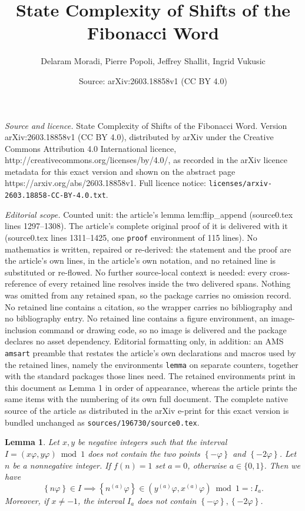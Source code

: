 \documentclass[10pt,a4paper]{amsart}
\title{State Complexity of Shifts of the Fibonacci Word}
\author{Delaram Moradi, Pierre Popoli, Jeffrey Shallit, Ingrid Vukusic}
\date{Source: arXiv:2603.18858v1 (CC BY 4.0)}
\newtheorem{lemma}{Lemma}
\newcommand{\append}[2]{#1^{(#2)}}
\newcommand{\fract}[1]{\left\{ #1 \right\}}
\newcommand{\ndelta}{n^{(a)}}
\renewcommand{\phi}{\varphi}
\begin{document}
\maketitle

\noindent\emph{Source and licence.} State Complexity of Shifts of the Fibonacci Word. Version arXiv:2603.18858v1 (CC BY 4.0), distributed by arXiv under the Creative Commons Attribution 4.0 International licence, http://creativecommons.org/licenses/by/4.0/, as recorded in the arXiv licence metadata for this exact version and shown on the abstract page https://arxiv.org/abs/2603.18858v1. Full licence notice: \texttt{licenses/arxiv-2603.18858-CC-BY-4.0.txt}.\par\smallskip

\noindent\textit{Editorial scope.} Counted unit: the article's lemma lem:flip\_append (source0.tex lines 1297--1308). The article's complete original proof of it is delivered with it (source0.tex lines 1311--1425, one \texttt{proof} environment of 115 lines). No mathematics is written, repaired or re-derived: the statement and the proof are the article's own lines, in the article's own notation, and no retained line is substituted or re-flowed.  No further source-local context is needed: every cross-reference of every retained line resolves inside the two delivered spans.  Nothing was omitted from any retained span, so the package carries no omission record.  No retained line contains a citation, so the wrapper carries no bibliography and no bibliography entry.  No retained line contains a figure environment, an image-inclusion command or drawing code, so no image is delivered and the package declares no asset dependency.  Editorial formatting only, in addition: an AMS \texttt{amsart} preamble that restates the article's own declarations and macros used by the retained lines, namely the environments \texttt{lemma} on separate counters, together with the standard packages those lines need.  The retained environments print in this document as Lemma 1 in order of appearance, whereas the article prints the same items with the numbering of its own full document.  The complete native source of the article as distributed in the arXiv e-print for this exact version is bundled unchanged as \texttt{sources/196730/source0.tex}.
\begin{lemma}\label{lem:flip_append}
Let $x,y$ be negative integers such that the interval $I = (x \phi,y \phi) \bmod 1$ does not contain the two points $\fract{-\phi}$ and $\fract{-2\phi}$.
Let $n$ be a nonnegative integer. If $f(n) = 1$ set $a=0$, otherwise $a \in \{0,1\}$.
Then we have
\begin{equation}\label{eq:flip_append}
    \fract{n\phi} \in I
    \implies
    \fract{\ndelta\phi} \in (\append{y}{a} \phi, \append{x}{a} \phi)\bmod 1
    =: I_a.
\end{equation}
Moreover, if $x\neq -1$, the interval $I_a$ does not contain $\fract{-\phi}, \fract{-2\phi}$.
\end{lemma}
\end{document}
